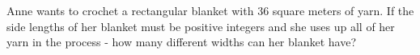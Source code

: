 Anne wants to crochet a rectangular blanket with $36$ square meters of yarn. If the side lengths of her blanket must be positive integers and she uses up all of her yarn in the process - how many different widths can her blanket have?
